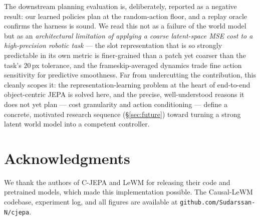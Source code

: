 \documentclass[12pt]{article}
\begin{document}
The downstream planning evaluation is, deliberately, reported as a negative result: our learned policies plan at the random-action floor, and a replay oracle confirms the harness is sound. We read this not as a failure of the world model but as an \emph{architectural limitation of applying a coarse latent-space MSE cost to a high-precision robotic task} --- the slot representation that is so strongly predictable in its own metric is finer-grained than a patch yet coarser than the task's $20$\,px tolerance, and the frameskip-averaged dynamics trade fine action sensitivity for predictive smoothness. Far from undercutting the contribution, this cleanly scopes it: the representation-learning problem at the heart of end-to-end object-centric JEPA is solved here, and the precise, well-understood reasons it does not yet plan --- cost granularity and action conditioning --- define a concrete, motivated research sequence (\S\ref{sec:future}) toward turning a strong latent world model into a competent controller.

\section*{Acknowledgments}

We thank the authors of C-JEPA and LeWM for releasing their code and pretrained models, which made this implementation possible. The Causal-LeWM codebase, experiment log, and all figures are available at \texttt{github.com/Sudarssan-N/cjepa}.
\end{document}
